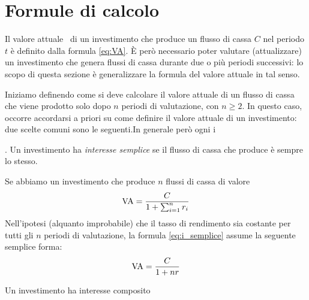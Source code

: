 \chapter{Formule di calcolo}
\label{chap:Formule_fondamentali}

Il valore attuale \VA\ di un investimento che produce un flusso di cassa
$C$ nel periodo $t$ è definito dalla formula \eqref{eq:VA}. È però necessario
poter valutare (attualizzare) un investimento che  genera flussi di cassa durante
due o più periodi successivi: lo scopo di questa sezione è generalizzare la formula
del valore attuale in tal senso.

Iniziamo definendo come si deve calcolare il valore
attuale di un flusso di cassa che viene prodotto solo dopo $n$ periodi di valutazione,
con $n\ge 2$. 
In questo caso, occorre accordarsi a priori su come definire il valore attuale
di un investimento: due scelte comuni sono le seguenti.In generale però ogni i
\begin{defn}. Un investimento ha \emph{interesse semplice} se il flusso di cassa
  che produce è sempre lo stesso.
\end{defn}
Se abbiamo un investimento che produce $n$ flussi di cassa di valore 
\begin{equation}
  \label{eq:i_semplice}
  \mathrm{VA}=\frac{C}{1+\sum_{i=1}^nr_i}
\end{equation}
Nell'ipotesi  (alquanto improbabile) che il tasso di rendimento sia costante per tutti
gli $n$ periodi di valutazione, la formula \eqref{eq:i_semplice} assume la seguente semplice
forma:
\[
  \mathrm{VA}=\frac{C}{1+nr}
\]
\begin{defn}
  Un investimento ha interesse composito 
\end{defn}

